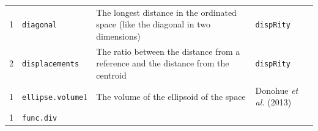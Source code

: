 \documentclass[]{book}
\begin{document}
\begin{longtable}[]{@{}llll@{}}
\begin{minipage}[t]{0.07\columnwidth}\raggedright
1\strut
\end{minipage} & \begin{minipage}[t]{0.07\columnwidth}\raggedright
\texttt{diagonal}\strut
\end{minipage} & \begin{minipage}[t]{0.64\columnwidth}\raggedright
The longest distance in the ordinated space (like the diagonal in two dimensions)\strut
\end{minipage} & \begin{minipage}[t]{0.10\columnwidth}\raggedright
\texttt{dispRity}\strut
\end{minipage}\tabularnewline
\begin{minipage}[t]{0.07\columnwidth}\raggedright
2\strut
\end{minipage} & \begin{minipage}[t]{0.07\columnwidth}\raggedright
\texttt{displacements}\strut
\end{minipage} & \begin{minipage}[t]{0.64\columnwidth}\raggedright
The ratio between the distance from a reference and the distance from the centroid\strut
\end{minipage} & \begin{minipage}[t]{0.10\columnwidth}\raggedright
\texttt{dispRity}\strut
\end{minipage}\tabularnewline
\begin{minipage}[t]{0.07\columnwidth}\raggedright
1\strut
\end{minipage} & \begin{minipage}[t]{0.07\columnwidth}\raggedright
\texttt{ellipse.volume}1\strut
\end{minipage} & \begin{minipage}[t]{0.64\columnwidth}\raggedright
The volume of the ellipsoid of the space\strut
\end{minipage} & \begin{minipage}[t]{0.10\columnwidth}\raggedright
Donohue \emph{et al.} (2013)\strut
\end{minipage}\tabularnewline
\begin{minipage}[t]{0.07\columnwidth}\raggedright
1\strut
\end{minipage} & \begin{minipage}[t]{0.07\columnwidth}\raggedright
\texttt{func.div}\strut
\end{minipage} & \begin{minipage}[t]{0.64\columnwidth}\raggedright

\end{minipage}
\end{longtable}
\end{document}
